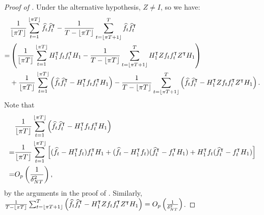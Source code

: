 \documentclass[12pt]{article}
\newcommand*{\tran}{\intercal}
\theoremstyle{plain}
\numberwithin{equation}{section}
\begin{document}
\begin{proof}[Proof of ]
Under the alternative hypothesis, $Z \neq I$, so we have:
\begin{align*}
&\dfrac{1}{\floor{\pi T}} \sumTfloor \widehat{f}_t \widehat{f}_t^\tran - \frac{1}{T - \floor{\pi T}} \sumTfloort \widehat{f}_t \widehat{f}_t^\tran \\
= 
&\left( 
	\frac{1}{\floor{\pi T}} 
	\sumTfloor H_1^\tran f_t f_t^\tran H_1
	- \frac{1}{T - \floor{\pi T}}
	\sumTfloort H_1^\tran Z f_t f_t^\tran Z^\tran H_1 
\right) \\
&+ \frac{1}{\floor{\pi T}}
	\sumTfloor
	\left( \widehat{f}_t \widehat{f}_t^\tran - H_1^\tran f_t f_t^\tran H_1 \right) 
- \frac{1}{T - \floor{\pi T}}
	\sumTfloort
	\left( \widehat{f}_t \widehat{f}_t^\tran - H_1^\tran Z f_t f_t^\tran Z^\tran H_1 \right).
\end{align*}
Note that
\begin{align*}
&\frac{1}{\floor{\pi T}}
	\sumTfloor
	\left( \widehat{f}_t \widehat{f}_t^\tran - H_1^\tran f_t f_t^\tran H_1 \right) \\
= &\frac{1}{\floor{\pi T}} \sumTfloor
\left[ 
	(\widehat{f}_t - H_1^\tran f_t) f_t^\tran H_1 + 
	(\widehat{f}_t - H_1^\tran f_t)(\widehat{f}_t^\tran - f_t^\tran H_1) +
	H_1^\tran f_t(\widehat{f}_t^\tran - f_t^\tran H_1) 
\right] 
\\
= &\Opdeltasq,
\end{align*}
by the arguments in the proof of . Similarly, \\
$\frac{1}{T - \floor{\pi T}}
	\sumTfloort
	\left( \widehat{f}_t \widehat{f}_t^\tran - H_1^\tran Z f_t f_t^\tran Z^\tran H_1 \right) = \Opdeltasq$. 


\end{proof}
\end{document}
